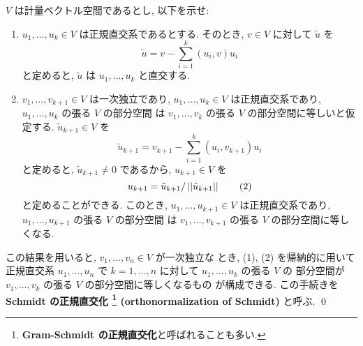 \documentclass[12pt,twoside]{jarticle}
\begin{document}

\begin{question}[Schmidtの正規直交化法]
  \label{def:Schmidt}
  $V$ は計量ベクトル空間であるとし, 以下を示せ:
  \begin{enumerate}
  \item $u_1,\ldots,u_k\in V$ は正規直交系であるとする.
    そのとき, $v\in V$ に対して $\tilde{u}$ を
    \begin{equation*}
      \tilde{u} = v - \sum_{i=1}^k (u_i,v)u_i
    \end{equation*}
    と定めると, $\tilde{u}$ は $u_1,\ldots,u_k$ と直交する.
  \item $v_1,\ldots,v_{k+1}\in V$ は一次独立であり,
    $u_1,\ldots,u_k\in V$ は正規直交系であり, 
    $u_1,\ldots,u_k$ の張る $V$ の部分空間
    は $v_1,\ldots,v_k$ の張る $V$ の部分空間に等しいと仮定する.
    $\tilde{u}_{k+1}\in V$ を
    \begin{equation*}
      \tilde{u}_{k+1} = v_{k+1} - \sum_{i=1}^k (u_i,v_{k+1})u_i
      \tag{1}
    \end{equation*}
    と定めると,  $\tilde{u}_{k+1}\ne 0$ であるから, $u_{k+1}\in V$ を
    \begin{equation*}
      u_{k+1} = \tilde{u}_{k+1}/\left|\left|\tilde{u}_{k+1}\right|\right|
      \tag{2}
    \end{equation*}
    と定めることができる.
    このとき, $u_1,\ldots,u_{k+1}\in V$ は正規直交系であり, 
    $u_1,\ldots,u_{k+1}$ の張る $V$ の部分空間
    は $v_1,\ldots,v_{k+1}$ の張る $V$ の部分空間に等しくなる.
  \end{enumerate}
  この結果を用いると, $v_1,\ldots,v_n\in V$ が一次独立な
  とき, (1), (2) を帰納的に用いて正規直交系 $u_1,\ldots,u_n$ 
  で $k=1,\ldots,n$ に対して $u_1,\ldots,u_k$ の張る $V$ の
  部分空間が $v_1,\ldots,v_k$ の張る $V$ の部分空間に等しくなるもの
  が構成できる.  この手続きを 
  {\bf Schmidt の正規直交化%
    \footnote{{\bf Gram-Schmidt の正規直交化}と呼ばれることも多い.}
    (orthonormalization of Schmidt)} と呼ぶ.
  \qed
\end{question}
\end{document}

